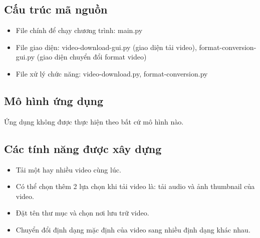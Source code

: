 \documentclass{article} %
\begin{document}
\subsection{Cấu trúc mã nguồn}
\begin{itemize}
    \item File chính để chạy chương trình: main.py
    \item File giao diện: video-download-gui.py (giao diện tải video), format-conversion-gui.py (giao diện chuyển đổi format video)
    \item File xử lý chức năng: video-download.py, format-conversion.py
\end{itemize}
\subsection{Mô hình ứng dụng}
Ứng dụng không được thực hiện theo bất cứ mô hình nào.
\subsection{Các tính năng được xây dựng}
\begin{itemize}
    \item Tải một hay nhiều video cùng lúc.
    \item Có thể chọn thêm 2 lựa chọn khi tải video là: tải audio và ảnh thumbnail của video.
    \item Đặt tên thư mục và chọn nơi lưu trữ video.
    \item Chuyển đổi định dạng mặc định của video sang nhiều định dạng khác nhau.
\end{itemize}
\end{document}
